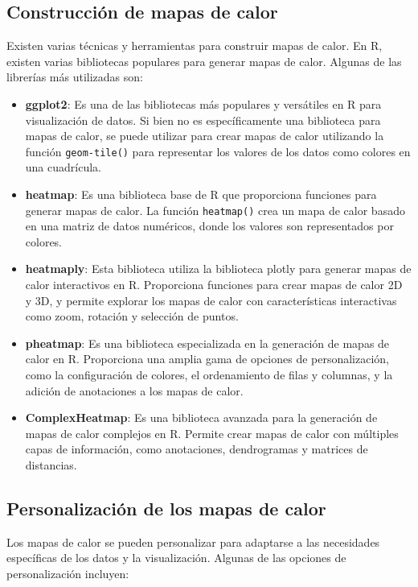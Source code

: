 \documentclass{article}
\begin{document}
\subsection{Construcción de mapas de calor}

Existen varias técnicas y herramientas para construir mapas de calor. En R, existen varias bibliotecas populares para generar mapas de calor. Algunas de las librerías más utilizadas son:

\begin{itemize}
\item \textbf{ggplot2}: Es una de las bibliotecas más populares y versátiles en R para visualización de datos. Si bien no es específicamente una biblioteca para mapas de calor, se puede utilizar para crear mapas de calor utilizando la función \texttt{geom-tile()} para representar los valores de los datos como colores en una cuadrícula.

\item \textbf{heatmap}: Es una biblioteca base de R que proporciona funciones para generar mapas de calor. La función \texttt{heatmap()} crea un mapa de calor basado en una matriz de datos numéricos, donde los valores son representados por colores.

\item \textbf{heatmaply}: Esta biblioteca utiliza la biblioteca plotly para generar mapas de calor interactivos en R. Proporciona funciones para crear mapas de calor 2D y 3D, y permite explorar los mapas de calor con características interactivas como zoom, rotación y selección de puntos.

\item \textbf{pheatmap}: Es una biblioteca especializada en la generación de mapas de calor en R. Proporciona una amplia gama de opciones de personalización, como la configuración de colores, el ordenamiento de filas y columnas, y la adición de anotaciones a los mapas de calor.

\item \textbf{ComplexHeatmap}: Es una biblioteca avanzada para la generación de mapas de calor complejos en R. Permite crear mapas de calor con múltiples capas de información, como anotaciones, dendrogramas y matrices de distancias.
\end{itemize}


\subsection{Personalización de los mapas de calor}
Los mapas de calor se pueden personalizar para adaptarse a las necesidades específicas de los datos y la visualización. Algunas de las opciones de personalización incluyen:
\end{document}
